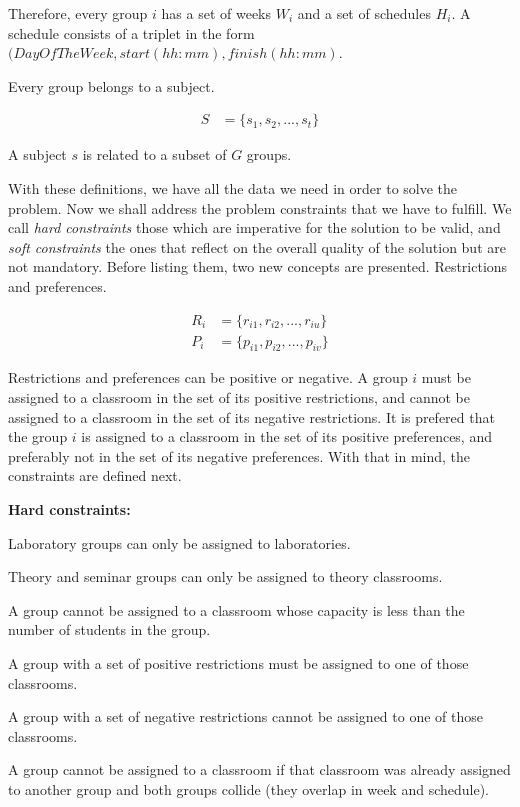 Therefore, every group $i$ has a set of weeks $W_{i}$ and a set of schedules $H_{i}$. A schedule consists of a triplet in the form $(DayOfTheWeek, start (hh:mm), finish (hh:mm)$.

Every group belongs to a subject.

\begin{align}
    S &= \{ s_{1}, s_{2}, ..., s_{t} \}
\end{align}

A subject $s$ is related to a subset of $G$ groups.

With these definitions, we have all the data we need in order to solve the problem. Now we shall address the problem constraints that we have to fulfill. We call \textit{hard constraints} those which are imperative for the solution to be valid, and \textit{soft constraints} the ones that reflect on the overall quality of the solution but are not mandatory. Before listing them, two new concepts are presented. Restrictions and preferences.

\begin{align}
    R_{i} &= \{ r_{i1}, r_{i2}, ..., r_{iu} \}\\
    P_{i} &= \{ p_{i1}, p_{i2}, ..., p_{iv} \}
\end{align}

Restrictions and preferences can be positive or negative. A group $i$ must be assigned to a classroom in the set of its positive restrictions, and cannot be assigned to a classroom in the set of its negative restrictions. It is prefered that the group $i$ is assigned to a classroom in the set of its positive preferences, and preferably not in the set of its negative preferences. With that in mind, the constraints are defined next. 

\textbf{Hard constraints:}

\begin{description}
    \item Laboratory groups can only be assigned to laboratories.
    \item Theory and seminar groups can only be assigned to theory classrooms.
    \item A group cannot be assigned to a classroom whose capacity is less than the number of students in the group.
    \item A group with a set of positive restrictions must be assigned to one of those classrooms.
    \item A group with a set of negative restrictions cannot be assigned to one of those classrooms.
    \item A group cannot be assigned to a classroom if that classroom was already assigned to another group and both groups collide (they overlap in week and schedule).
\end{description}

